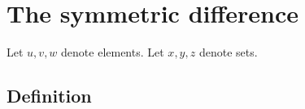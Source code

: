\documentclass[../../set-theory.ftl.tex]{subfiles}
\begin{document}
  \begin{comment}
    \begin{forthel}

    \end{forthel}
  \end{comment}


  \section{The symmetric difference}

  \begin{forthel}
  \end{forthel}

  \begin{forthel}
    Let $u,v,w$ denote elements.
    Let $x,y,z$ denote sets.
  \end{forthel}

  \subsection{Definition}
\end{document}
